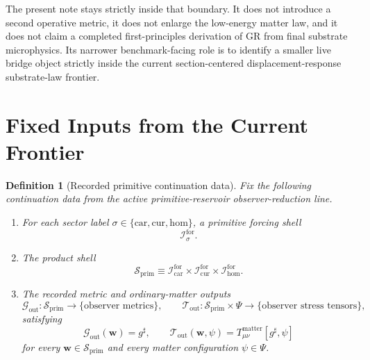 \documentclass[11pt]{article}
\newcommand{\CompletedMetric}{g^{\sharp}}
\newcommand{\MatterSpace}{\Psi}
\newcommand{\Car}{\mathrm{car}}
\newcommand{\Cur}{\mathrm{cur}}
\newcommand{\Hom}{\mathrm{hom}}
\newcommand{\ForSpace}[1]{\mathcal I_{#1}^{\mathrm{for}}}
\newcommand{\PrimShell}{\mathcal S_{\mathrm{prim}}}
\newcommand{\MetricOut}{\mathscr G_{\mathrm{out}}}
\newcommand{\MatterOut}{\mathscr T_{\mathrm{out}}}
\newtheorem{definition}{Definition}
\begin{document}
The present note stays strictly inside that boundary. It does not introduce a second operative metric, it does not enlarge the low-energy matter law, and it does not claim a completed first-principles derivation of GR from final substrate microphysics. Its narrower benchmark-facing role is to identify a smaller live bridge object strictly inside the current section-centered displacement-response substrate-law frontier.

\section{Fixed Inputs from the Current Frontier}

\begin{definition}[Recorded primitive continuation data]
\label{def:fixed}
Fix the following continuation data from the active primitive-reservoir observer-reduction line.
\begin{enumerate}
    \item For each sector label \(\sigma\in\{\Car,\Cur,\Hom\}\), a primitive forcing shell
    \[
    \ForSpace{\sigma}.
    \]
    \item The product shell
    \[
    \PrimShell
    \equiv
    \ForSpace{\Car}\times \ForSpace{\Cur}\times \ForSpace{\Hom}.
    \]
    \item The recorded metric and ordinary-matter outputs
    \[
    \MetricOut:\PrimShell\to\{\text{observer metrics}\},
    \qquad
    \MatterOut:\PrimShell\times\MatterSpace\to\{\text{observer stress tensors}\},
    \]
    satisfying
    \begin{equation}
    \MetricOut(\mathbf w)=\CompletedMetric,
    \qquad
    \MatterOut(\mathbf w,\psi)
    =
    T_{\mu\nu}^{\mathrm{matter}}[\CompletedMetric,\psi]
    \label{eq:fixedoutputs}
    \end{equation}
    for every \(\mathbf w\in\PrimShell\) and every matter configuration \(\psi\in\MatterSpace\).
\end{enumerate}
\end{definition}
\end{document}
